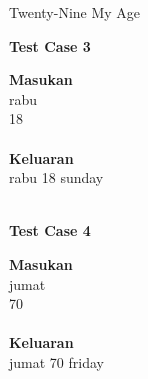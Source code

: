 \begin{permasalahan}{Twenty-Nine My Age}
	\begin{center}
	\textbf{Test Case 3}\\
	\end{center}
	\textbf{Masukan}\\
	rabu \\
	18 \\\\
	\textbf{Keluaran}\\
	rabu 18 sunday\\\\
	
	\begin{center}
	\textbf{Test Case 4}\\
	\end{center}
	\textbf{Masukan}\\
	jumat \\
	70 \\\\
	\textbf{Keluaran}\\
	jumat 70 friday\\	
\end{permasalahan}



